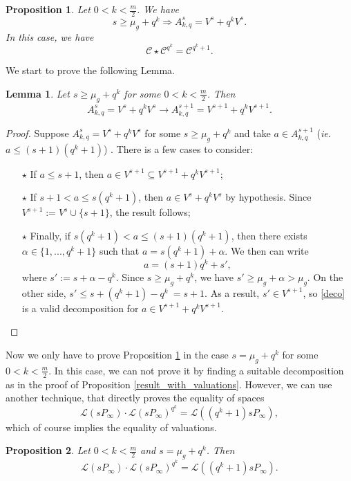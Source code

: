 \documentclass[a4paper]{article}
\newtheorem{prop1}{Proposition}
\newtheorem{lem1}{Lemma}
\newcommand{\calL}{\mathcal{L}}
\newcommand{\calC}{\mathcal{C}}
\begin{document}
\begin{prop1} \label{powers_of_q's_case}
Let $0 < k < \frac{m}{2}$. We have
\[ s \geq \mu_g+q^k \Rightarrow A^s_{k,q} = V^s+q^kV^s.\]
In this case, we have 
 \[ \calC \star \calC^{q^k} = \calC^{q^k+1}.\]
\end{prop1}

We start to prove the following Lemma.

\begin{lem1} \label{technical_lemma}
Let $s \geq \mu_g+q^k$ for some $0 < k < \frac{m}{2}$. Then 
\[A^s_{k,q} = V^s+q^kV^s \rightarrow A^{s+1}_{k,q} = V^{s+1}+q^kV^{s+1}.\]
\end{lem1}

\begin{proof}
Suppose $A^s_{k,q} = V^s+q^kV^s$ for some $s \geq \mu_g+q^k$ and take $a \in A^{s+1}_{k,q}$ (\emph{ie}. $a \leq (s+1)(q^k+1)$) . There is a few cases to consider:
\begin{itemize}
    \item[$\star$] If $a \leq s+1$, then $a \in V^{s+1} \subseteq V^{s+1}+q^kV^{s+1}$;
    \item[$\star$] If $s+1 < a \leq s(q^k+1)$, then $a \in V^s+q^kV^s$ by hypothesis. Since $V^{s+1} := V^s \cup \{s+1\}$, the result follows;
    \item[$\star$] Finally, if $s(q^k+1) < a \leq (s+1)(q^k+1)$, then there exists $\alpha \in \{1,...,q^k+1\}$ such that $a=s(q^k+1)+\alpha$. We then can write 
    \begin{equation} \label{deco}
        a = (s+1)q^k + s',
    \end{equation}
    where $s':=s+\alpha-q^k$. Since $s \geq \mu_g+q^k$, we have $s' \geq \mu_g+\alpha > \mu_g$. On the other side, $s' \leq s+(q^k+1)-q^k~=s+1$. As a result, $s' \in V^{s+1}$, so \eqref{deco} is a valid decomposition for $a \in V^{s+1}+q^kV^{s+1}$.
\end{itemize}
\end{proof}

Now we only have to prove Proposition \ref{powers_of_q's_case} in the case $s=\mu_g+q^k$ for some $0 < k < \frac{m}{2}$. In this case, we can not prove it by finding a suitable decomposition as in the proof of Proposition \ref{result_with_valuations}. However, we can use another technique, that directly proves the equality of spaces 
\[\calL(sP_{\infty}) \cdot \calL(sP_{\infty})^{q^k} =\calL((q^k+1)sP_{\infty}),\]
which of course implies the equality of valuations.

\begin{prop1} \label{prop_avec_dessins}
Let $0 < k < \frac{m}{2}$ and $s=\mu_g+q^k$. Then 
\[\calL(sP_{\infty}) \cdot \calL(sP_{\infty})^{q^k} =\calL((q^k+1)sP_{\infty}).\]
\end{prop1}
\end{document}
